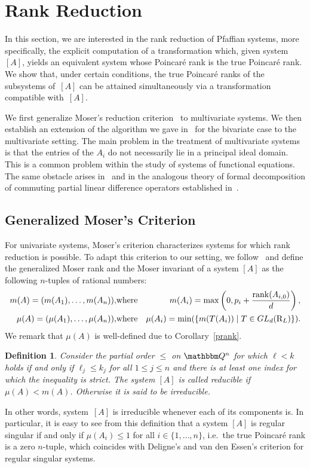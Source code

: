 \documentclass[final,1p,times,number,amsthm]{elsart}
\newtheorem{definition}[lemma]{Definition}
\let\set\mathbbm
\begin{document}
\section{Rank Reduction}
\label{sec:rankred}
In this section, we are interested in the rank reduction of Pfaffian systems,
more specifically, the explicit computation of a transformation which, given
system~$[A]$, yields an equivalent system whose Poincar\'e rank is the true
Poincar\'e rank. We show that, under certain conditions, the true Poincar\'e
ranks of the subsystems of~$[A]$ can be attained simultaneously via a
transformation compatible with~$[A]$.

We first generalize Moser's reduction criterion~\cite{key19} to multivariate
systems. We then establish an extension of the algorithm we gave
in~\cite{key101} for the bivariate case to the multivariate setting. The main
problem in the treatment of multivariate systems is that the entries of the
$A_i$ do not necessarily lie in a principal ideal domain. This is a common
problem within the study of systems of functional equations. The same obstacle
arises in~\cite{key5} and in the analogous theory of formal decomposition of
commuting partial linear difference operators established in~\cite{key3239}.

\subsection{Generalized Moser's Criterion}
\label{criterionpfaff}
For univariate systems, Moser's criterion characterizes systems for which rank
reduction is possible. To adapt this criterion to our setting, we
follow~\cite{key41,key19} and define the generalized Moser rank and the Moser
invariant of a system $[A]$ as the following $n$-tuples of rational numbers:
\begin{eqnarray*}
  m (A) = (m (A_1) , \dots, m (A_n)), & \text{where} &  m (A_{i}) =
\max\left(0, p_i + \frac{\operatorname{rank}(A_{i,0})}{d}\right),\\ 
\mu (A) = (\mu (A_1) , \dots, \mu (A_n)), & \text{where} &  \mu (A_{i})
= \operatorname{min}(\{ m (T(A_i)) \mid T \in GL_d({\rm R}_L) \}).
\end{eqnarray*} 
We remark that $\mu(A)$ is well-defined due to Corollary~\ref{prank}.
\begin{definition}
  Consider the partial order $\leq$ on $\set Q^n$ for which $\ell < k$ holds if
  and only if $\ell_j\leq k_j$ for all $1\leq j\leq n$ and there is at least one
  index for which the inequality is strict. The system $[A]$ is called
  reducible if $\mu(A) < m(A)$. Otherwise it is said to be irreducible.
\end{definition}
In other words, system~$[A]$ is irreducible whenever each of its components
is. In particular, it is easy to see from this definition that a system $[A]$ is
regular singular if and only if $\mu(A_i) \leq 1$ for all
$i \in \{ 1, \dots, n\}$, i.e.\ the true Poincar\'e rank is a zero $n$-tuple,
which coincides with Deligne's and van den Essen's criterion for regular
singular systems.
\end{document}
